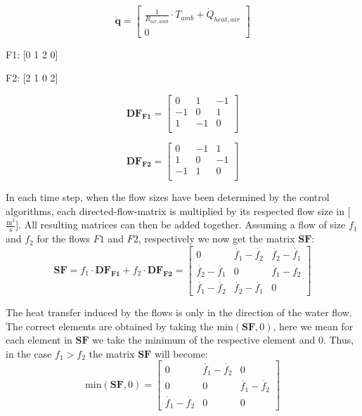 \begin{equation}
	\mathbf{\dot{q}} =
	\begin{bmatrix}
		\frac{1}{R_{air, amb}} \cdot T_{amb} + \dot{Q}_{heat, air} \\
		0
	\end{bmatrix}
\end{equation}


F1: [0 1 2 0]

F2: [2 1 0 2]

\begin{equation}
	\mathbf{DF_{F1}} = 
	\begin{bmatrix}
		0 & 1 &-1  \\
		-1 & 0 & 1  \\
		1 &-1 & 0  \\
	\end{bmatrix}
	\label{eq:DFflow1}
\end{equation}

\begin{equation}
	\mathbf{DF_{F2}} = 
	\begin{bmatrix}
		0 &-1 & 1  \\
		1 & 0 &-1  \\
		-1 & 1 & 0  \\
	\end{bmatrix}
	\label{eq:DFflow1}
\end{equation}

In each time step, when the flow sizes have been determined by the control algorithms, each directed-flow-matrix is multiplied by its respected flow size in [$\frac{\text{m}^3}{\text{s}}$]. All resulting matrices can then be added together. Assuming a flow of size $f_1$ and $f_2$ for the flows $F1$ and $F2$, respectively we now get the matrix $\mathbf{SF}$:
\begin{equation}
	\mathbf{SF} = f_1 \cdot \mathbf{DF_{F1}} + f_2 \cdot \mathbf{DF_{F2}} = 
	\begin{bmatrix}
		0     & \dot{f_1}-\dot{f_2} & \dot{f_2}-\dot{f_1} \\
		\dot{ f_2}-\dot{f_1}  & 0       & \dot{f_1}-\dot{f_2} \\
		\dot{f_1}-\dot{f_2}  & \dot{f_2}-\dot{f_1} & 0       
	\end{bmatrix}
	\label{eq:addbufferflows}
\end{equation}

The heat transfer induced by the flows is only in the direction of the water flow. The correct elements are obtained by taking the $\text{min}(\mathbf{SF},0)$, here we mean for each element in $\mathbf{SF}$ we take the minimum of the respective element and 0. Thus, in the case $f_1>f_2$ the matrix $\mathbf{SF}$ will become:
\begin{equation}
	\text{min}(\mathbf{SF},0) =  \begin{bmatrix}
		0     & \dot{f_1}-\dot{f_2} & 0 \\
		0     & 0       & \dot{f_1}-\dot{f_2} \\
		\dot{f_1}-\dot{f_2}  & 0       & 0     
	\end{bmatrix}
	\label{eq:minSFzero}
\end{equation}

